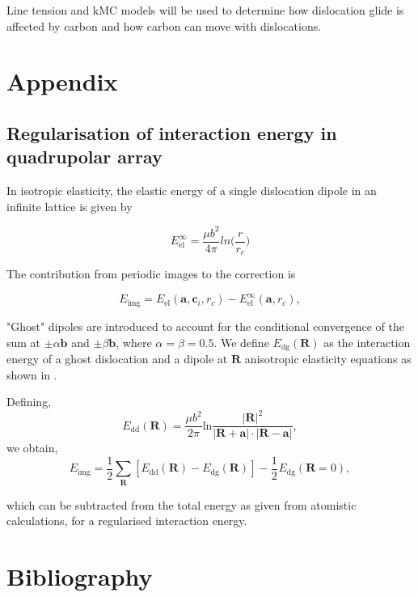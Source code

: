 \documentclass[a4paper,11pt]{article}
\begin{document}
Line tension and kMC models will be used to determine how dislocation glide is affected by carbon
and how carbon can move with dislocations. 



\section{Appendix}
\label{sec:org7aabd2d}

\subsection{Regularisation of interaction energy in quadrupolar array}
\label{sec:orge2975e1}
\label{sec:Ainteractionenergy}


In isotropic elasticity, the elastic energy of a single dislocation dipole in an
infinite lattice is given by


\[ E_{\text{el}}^{\infty} = \frac{\mu b^2}{4\pi} ln \big( \frac{r}{r_{c}} \big)  \]

The contribution from periodic images to the correction is 

\[ E_{\text{img} } = E_{\text{el}} (\mathbf{a}, \mathbf{c}_i , r_c) - E_{\text{el}}^{\infty}
   (\mathbf{a}, r_c),\]

"Ghost" dipoles are introduced to account for the conditional convergence of the sum at \(\pm\alpha
   \mathbf{b}\) and \(\pm \beta\mathbf{b}\), where \(\alpha = \beta = 0.5\). We define \(E_{\text{dg}} (\mathbf{R})\) as the
interaction energy of a ghost dislocation and a dipole at \(\mathbf{R}\) anisotropic elasticity
equations as shown in \cite{Cai2003}.


Defining, 
 \[ E_{\text{dd}} (\mathbf{R}) = \frac{\mu b^2}{2\pi}
   \text{ln}\frac{|\mathbf{R}|^2}{|\mathbf{R}+\mathbf{a}|\cdot|\mathbf{R}-\mathbf{a}|},
   \]
we obtain,
\[ E_{\text{img}} = \frac{1}{2}\sum_{\mathbf{R}} [ E_{\text{dd}} (\mathbf{R}) - E_{\text{dg}} (\mathbf{R}) ] - \frac{1}{2}_{}
   E_{\text{dg}} (\mathbf{R} = 0),  \]

which can be subtracted from the total energy as given from atomistic calculations, for a
regularised interaction energy. 

\section{Bibliography}
\label{sec:org94d20ae}
\label{orga97fd5c}




\end{document}
